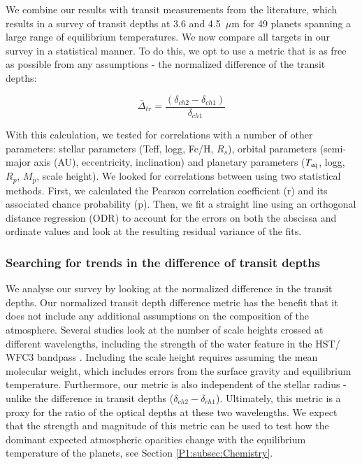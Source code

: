 We combine our results with transit measurements from the literature, which results in a survey of transit depths at 3.6 and 4.5~$\mu$m for 49 planets spanning a large range of equilibrium temperatures. We now compare all targets in our survey in a statistical manner. To do this, we opt to use a metric that is as free as possible from any assumptions - the normalized difference of the transit depths:

\begin{equation}
     \bar{\Delta}_{tr} = \frac{(\delta_{ch2} - \delta_{ch1})}{\delta_{ch1}}
\end{equation}

With this calculation, we tested for correlations with a number of other parameters:  stellar parameters (Teff, logg, Fe/H, $R_s$), orbital parameters (semi-major axis (AU), eccentricity, inclination) and planetary parameters ($T_{\rm eq}$, logg, $R_p$, $M_p$, scale height). We looked for correlations between using two statistical methods. First, we calculated the Pearson correlation coefficient (r) and its associated chance probability (p). Then, we fit a straight line using an orthogonal distance regression (ODR) to account for the errors on both the abscissa and ordinate values \citet{Boggs1989} and look at the resulting residual variance of the fits.

\subsubsection{Searching for trends in the difference of transit depths}

We analyse our \spitzer survey by looking at the normalized difference in the transit depths. Our normalized transit depth difference metric has the benefit that it does not include any additional assumptions on the composition of the atmosphere.  Several studies look at the number of scale heights crossed at different wavelengths, including the strength of the water feature in the HST/ WFC3 bandpass \citep[e.g.,][]{Sing2016}. Including the scale height requires assuming the mean molecular weight, which includes errors from the surface gravity and equilibrium temperature. Furthermore, our metric is also independent of the stellar radius - unlike the difference in transit depths ($\delta_{ch2} - \delta_{ch1}$). Ultimately, this metric is a proxy for the ratio of the optical depths at these two wavelengths. We expect that the strength and magnitude of this metric can be used to test how the dominant expected atmospheric opacities change with the equilibrium temperature of the planets, see Section \ref{P1:subsec:Chemistry}.

